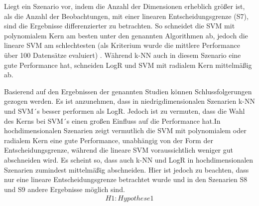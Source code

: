 \documentclass[
]{article}
\begin{document}
Liegt ein Szenario vor, indem die Anzahl der Dimensionen erheblich
größer ist, als die Anzahl der Beobachtungen, mit einer linearen
Entscheidungsgrenze (S7), sind die Ergebnisse differenzierter zu
betrachten. So schneidet die SVM mit polynomialem Kern am besten unter
den genannten Algorithmen ab, jedoch die lineare SVM am schlechtesten
(als Kriterium wurde die mittlere Performance über 100 Datensätze
evaluiert) \parencite{scholzComparisonClassificationMethods2021}.
Während k-NN auch in diesem Szenario eine gute Performance hat,
schneiden LogR und SVM mit radialem Kern mittelmäßig ab.

Basierend auf den Ergebnissen der genannten Studien können
Schlussfolgerungen gezogen werden. Es ist anzunehmen, dass in
niedrigdimensionalen Szenarien k-NN und SVM´s besser performen als LogR.
Jedoch ist zu vermuten, dass die Wahl des Kerns bei SVM´s einen großen
Einfluss auf die Performance hat.\newline In hochdimensionalen Szenarien
zeigt vermutlich die SVM mit polynomialem oder radialem Kern eine gute
Performance, unabhängig von der Form der Entscheidungsgrenze, während
die lineare SVM voraussichtlich weniger gut abschneiden wird. Es scheint
so, dass auch k-NN und LogR in hochdimensionalen Szenarien zumindest
mittelmäßig abschneiden. Hier ist jedoch zu beachten, dass nur eine
lineare Entscheidungsgrenze betrachtet wurde und in den Szenarien S8 und
S9 andere Ergebnisse möglich sind.\newline \begin{align}
H1: Hypothese 1
\end{align}

\printbibliography
\end{document}
